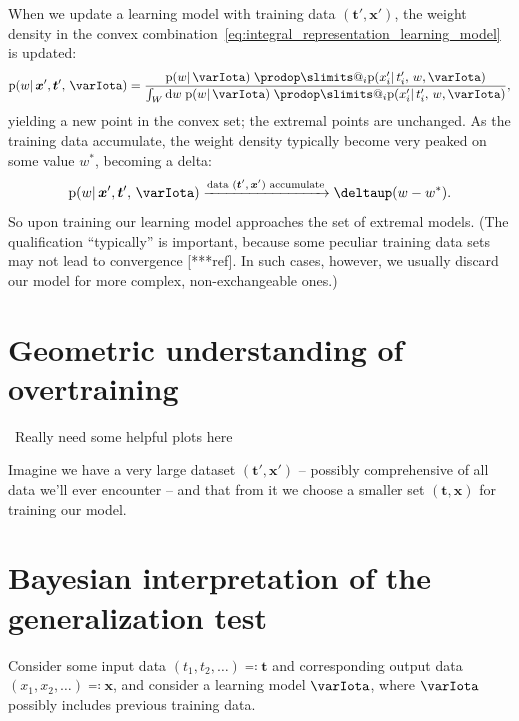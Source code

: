 \documentclass[\ifafour a4paper,12pt,\else a5paper,10pt,\fi%
onecolumn,oneside,article,%
british%
]{memoir}
\makeatletter
\theoremstyle{remark}
\theoremstyle{innote}
\def\prod{\DOTSI\prodop\slimits@}
\newcommand*{\delt}{\deltaup}%
\newcommand*{\di}{\mathrm{d}}%
\newcommand*{\defs}{\eqqcolon}
\newcommand*{\pf}{\mathrm{p}}%
\renewcommand*{\|}{\mathpunct{|}}
\newcommand*{\puzzle}{\maltese}
\newcommand{\mynote}[1]{ {\color{notecolour}\puzzle\ #1}}
\newcommand*{\yI}{\varIota}
\newcommand*{\yt}{\bm{t}}
\newcommand*{\yx}{\bm{x}}
\newcommand*{\ytn}{\yt'}
\newcommand*{\yxn}{\yx'}
\newcommand*{\ytt}{\yt'}
\newcommand*{\yxx}{\yx'}
\newcommand*{\yw}{w}
\newcommand*{\yws}{W}
\newcommand*{\ywp}{\yw^{*}}
\makeatother
\begin{document}
When we update a learning model with training data $(\ytn, \yxn)$, the
weight density in the convex
combination~\eqref{eq:integral_representation_learning_model} is updated:
\begin{equation}
  \label{eq:update_weights}
  \pf(\yw \| \yxn, \ytn,\, \yI) =
  \frac{
    \pf(\yw \| \yI)\;
    \prod_i  \pf(x_i' \| t_i',\, \yw, \yI)
  }{
   \int_{\yws}\di\yw\;   \pf(\yw \| \yI)\;
\prod_i  \pf(x_i' \| t_i',\, \yw, \yI)
  },
\end{equation}
yielding a new point in the convex set; the extremal points are unchanged.
As the training data accumulate, the weight density typically become very
peaked on some value $\ywp$, becoming a delta:
\begin{equation}
  \label{eq:update_weights_delta}
  \pf(\yw \| \yxn, \ytn,\, \yI) \xrightarrow{\text{data $(\ytn, \yxn)$ accumulate}}
\delt(\yw-\ywp).
\end{equation}
So upon training our learning model approaches the set of extremal models.
(The qualification \enquote{typically} is important, because some peculiar
training data sets may not lead to convergence [***ref]. In such cases,
however, we usually discard our model for more complex, non-exchangeable
ones.)

\bigskip



\section{Geometric understanding of overtraining}
\label{sec:geom_understanding_overtr}

\mynote{Really need some helpful plots here}

Imagine we have a very large dataset $(\ytt, \yxx)$ -- possibly
comprehensive of all data we'll ever encounter -- and that from it we
choose a smaller set $(\yt, \yx)$ for training our model.



\section{Bayesian interpretation of the generalization test}
\label{sec:bayes_gentest}

Consider some input data $(t_1, t_2, \dotsc) \defs \yt$ and corresponding
output data $(x_1, x_2, \dotsc) \defs \yx$, and consider a learning model
$\yI$, where $\yI$ possibly includes previous training data.
\end{document}
